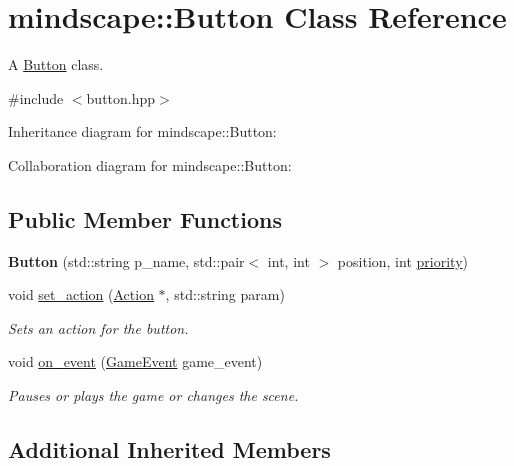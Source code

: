 \hypertarget{classmindscape_1_1_button}{}\section{mindscape\+:\+:Button Class Reference}
\label{classmindscape_1_1_button}


A \hyperlink{classmindscape_1_1_button}{Button} class.  




{\ttfamily \#include $<$button.\+hpp$>$}



Inheritance diagram for mindscape\+:\+:Button\+:


Collaboration diagram for mindscape\+:\+:Button\+:
\subsection*{Public Member Functions}
\begin{DoxyCompactItemize}
\item 
{\bfseries Button} (std\+::string p\+\_\+name, std\+::pair$<$ int, int $>$ position, int \hyperlink{classengine_1_1_game_object_a159ecaca30229e302793b11a75bd13c2}{priority})\hypertarget{classmindscape_1_1_button_a7a787c4e0289867988522f676fcb5f76}{}\label{classmindscape_1_1_button_a7a787c4e0289867988522f676fcb5f76}

\item 
void \hyperlink{classmindscape_1_1_button_ae097539464c762e064650be581b1a5d8}{set\+\_\+action} (\hyperlink{classmindscape_1_1_action}{Action} $\ast$, std\+::string param)
\begin{DoxyCompactList}\small\item\em Sets an action for the button. \end{DoxyCompactList}\item 
void \hyperlink{classmindscape_1_1_button_a1c5f7eea78429535c6cc76bcdf778a94}{on\+\_\+event} (\hyperlink{class_game_event}{Game\+Event} game\+\_\+event)
\begin{DoxyCompactList}\small\item\em Pauses or plays the game or changes the scene. \end{DoxyCompactList}\end{DoxyCompactItemize}
\subsection*{Additional Inherited Members}


